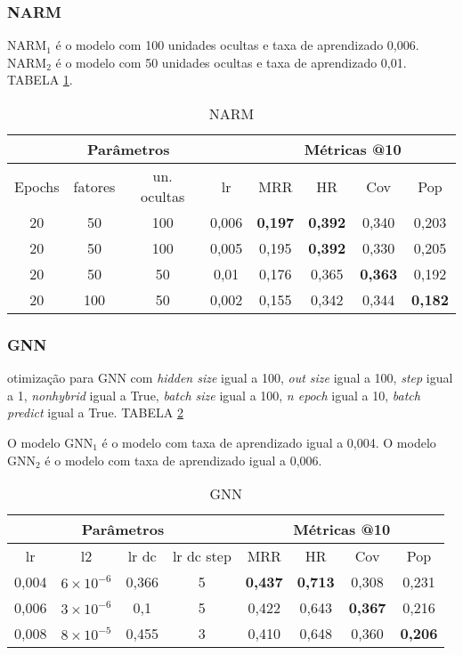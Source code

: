 \subsubsection{NARM}
$\text{NARM}_{1}$ é o modelo com 100 unidades ocultas e taxa de aprendizado 0,006.
$\text{NARM}_{2}$ é o modelo com 50 unidades ocultas e taxa de aprendizado 0,01.
TABELA \ref{app:narm2}.
\begin{table}[htbp]
  \centering
  \begin{tabular}{|c|c|c|c|c|c|c|c|}
    \hline
      \multicolumn{4}{|c|}{Parâmetros} & \multicolumn{4}{c|}{Métricas @10} \\
      \hline
      Epochs & fatores & un. ocultas & lr & MRR & HR & Cov & Pop \\
      \hline
      20 & 50 & 100 & 0,006 & \textbf{0,197} & \textbf{0,392} & 0,340 & 0,203 \\
      \hline
      20 & 50 & 100 & 0,005 & 0,195 & \textbf{0,392} & 0,330 & 0,205 \\
      \hline
      20 & 50 & 50 & 0,01 & 0,176 & 0,365 & \textbf{0,363} & 0,192 \\
      \hline
      20 & 100 & 50 & 0,002 & 0,155 & 0,342 & 0,344 & \textbf{0,182} \\
      \hline
      \end{tabular}
      \caption{NARM}
      \label{app:narm2}
\end{table}

\subsubsection{GNN}
otimização para GNN com \textit{hidden size} igual a 100, \textit{out size} igual a 100,
\textit{step} igual a 1, \textit{nonhybrid} igual a True, \textit{batch size} igual a 100,
\textit{n epoch} igual a 10, \textit{batch predict} igual a True. TABELA \ref{app:gnn_AP2}

O modelo $\text{GNN}_{1}$ é o modelo com taxa de aprendizado igual a 0,004.
O modelo $\text{GNN}_{2}$ é o modelo com taxa de aprendizado igual a 0,006.
\begin{table}
  \centering
  \begin{tabular}{|c|c|c|c|c|c|c|c|}
    \hline
      \multicolumn{4}{|c|}{Parâmetros} & \multicolumn{4}{c|}{Métricas @10} \\
      \hline
      lr & l2 & lr dc & lr dc step & MRR & HR & Cov & Pop \\
      \hline
      0,004 & $6 \times 10^{-6}$ & 0,366 & 5 & \textbf{0,437} & \textbf{0,713} & 0,308 & 0,231 \\
      \hline
      0,006 & $3 \times 10^{-6}$ & 0,1 & 5 & 0,422 & 0,643 & \textbf{0,367} & 0,216 \\
      \hline
      0,008 & $8 \times 10^{-5}$ & 0,455 & 3 & 0,410 & 0,648 & 0,360 & \textbf{0,206} \\
      \hline
      \end{tabular} \label{app:gnn_AP2}
      \caption{GNN}
\end{table}

